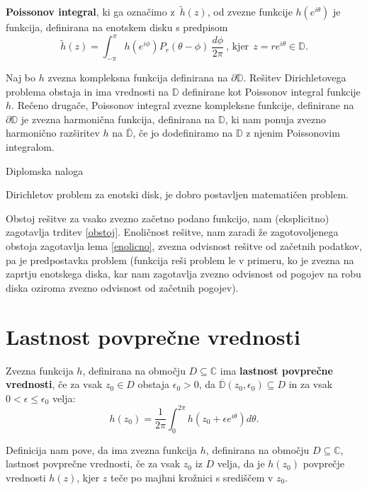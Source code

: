 \documentclass[mat1]{fmfdelo}
\newcommand{\C}{\mathbb C}
\begin{document}
    \begin{definicija}
        \textbf{Poissonov integral}, ki ga označimo z~$\widetilde{h}(z)$, od zvezne funkcije $h(e^{i\theta})$ je funkcija, definirana na enotskem disku s predpisom
        $$
        \widetilde{h}(z) = \int_{-\pi}^{\pi}{h(e^{i\phi}) P_r(\theta - \phi)~\frac{d\phi}{2 \pi}}~\text{, kjer}~~z = r e^{i\theta} \in \mathbb{D}.
        $$
     \end{definicija}
     \begin{trditev}
        \label{obstoj}
        Naj bo $h$ zvezna kompleksna funkcija definirana na $\partial \mathbb{D}$. Rešitev Dirichletovega problema obstaja in ima vrednosti na $\mathbb{D}$ definirane kot Poissonov integral funkcije $h$.
        \newline
        Rečeno drugače, Poissonov integral zvezne kompleksne funkcije, definirane na $\partial \mathbb{D}$ je zvezna harmonična funkcija, definirana na $\mathbb{D}$, ki nam ponuja zvezno harmonično razširitev $h$ na $\overline{\mathbb{D}}$, če jo dodefiniramo na $\mathbb{D}$ z njenim Poissonovim integralom.
     \end{trditev}
     \begin{dokaz}
        Diplomska naloga
     \end{dokaz}
     \begin{posledica}
        Dirichletov problem za enotski disk, je dobro postavljen matematičen problem. 
    \end{posledica}
    \begin{dokaz}
        Obstoj rešitve za vsako zvezno začetno podano funkcijo, nam (eksplicitno) zagotavlja trditev \ref{obstoj}. Enoličnost rešitve, nam zaradi že zagotovoljenega obstoja zagotavlja lema \ref{enolicno}, zvezna odvisnost rešitve od začetnih podatkov, pa je predpostavka problem (funkcija reši problem le v primeru, ko je zvezna na zaprtju enotskega diska, kar nam zagotavlja zvezno odvisnost od pogojev na robu diska oziroma zvezno odvisnost od začetnih pogojev).
    \end{dokaz}

\section{Lastnost povprečne vrednosti}
     \begin{definicija}
        Zvezna funkcija $h$, definirana na območju $D \subseteq \C$ ima \textbf{lastnost povprečne vrednosti}, če za vsak $z_0 \in D$ obstaja $\epsilon_0 > 0$, da $\overline{\mathbb{D}}(z_0, \epsilon_0) \subseteq D$ in za vsak $0 < \epsilon \leq \epsilon_0 $ velja:
        $$
            h(z_0) = \frac{1}{2 \pi} \int_{0}^{2 \pi}{h(z_0 + \epsilon e^{i \theta}) d\theta}.
        $$
    \end{definicija}
    \begin{opomba}
        Definicija nam pove, da ima zvezna funkcija $h$, definirana na območju $D \subseteq \C$, lastnost povprečne vrednosti, če za vsak $z_0$ iz $D$ velja, 
        da je $h(z_0)$ povprečje vrednosti $h(z)$, kjer $z$ teče po majhni krožnici s središčem v $z_0$.
    \end{opomba}
\end{document}
